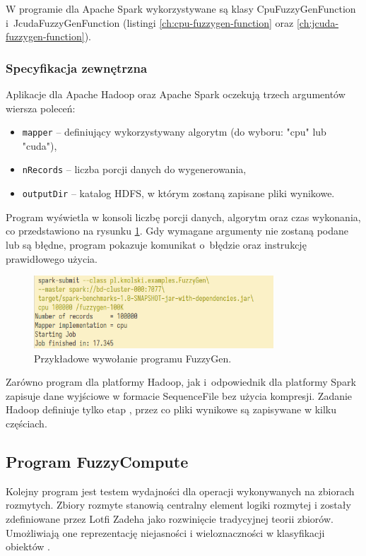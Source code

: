 W programie dla Apache Spark wykorzystywane są klasy CpuFuzzyGenFunction i~JcudaFuzzyGenFunction (listingi \ref{ch:cpu-fuzzygen-function} oraz \ref{ch:jcuda-fuzzygen-function}).

\subsubsection*{Specyfikacja zewnętrzna}

Aplikacje dla Apache Hadoop oraz Apache Spark oczekują trzech argumentów wiersza poleceń:
\begin{itemize}
	\item \lstinline{mapper} -- definiujący wykorzystywany algorytm (do wyboru: "cpu" lub "cuda"),
	\item \lstinline{nRecords} -- liczba porcji danych do wygenerowania,
	\item \lstinline{outputDir} -- katalog HDFS, w którym zostaną zapisane pliki wynikowe.
\end{itemize}

Program wyświetla w konsoli liczbę porcji danych, algorytm oraz czas wykonania, co przedstawiono
na rysunku \ref{fig:fuzzygen:run}. Gdy wymagane argumenty nie zostaną podane lub są błędne,
program pokazuje komunikat o~błędzie oraz instrukcję prawidłowego użycia.

\begin{figure}[h]
	\centering
	\includegraphics[width=0.8\textwidth]{graf/FuzzyGen-interface.png}
	\caption{Przykładowe wywołanie programu FuzzyGen.}
	\label{fig:fuzzygen:run}
\end{figure}

Zarówno program dla platformy Hadoop, jak i~odpowiednik dla platformy Spark zapisuje dane
wyjściowe w formacie SequenceFile bez użycia kompresji. Zadanie Hadoop definiuje tylko
etap , przez co pliki wynikowe są zapisywane w kilku częściach.

\subsection{Program FuzzyCompute}

Kolejny program jest testem wydajności dla operacji wykonywanych na zbiorach rozmytych.
Zbiory rozmyte stanowią centralny element logiki rozmytej i zostały zdefiniowane przez
Lotfi Zadeha jako rozwinięcie tradycyjnej teorii zbiorów. Umożliwiają one reprezentację
niejasności i wieloznaczności w klasyfikacji obiektów \cite{fuzzy-sets}.

